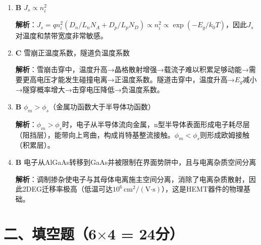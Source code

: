 \documentclass[12pt,a4paper]{ctexart}
\begin{document}
\begin{enumerate}[label=\arabic*.,nosep,leftmargin=2em]
\item \textbf{B} $J_s \propto n_i^2$

\textbf{解析}：$J_s = qn_i^2(D_n/L_nN_A + D_p/L_pN_D) \propto n_i^2 \propto \exp(-E_g/k_0T)$，因此$J_s$对温度和禁带宽度非常敏感。

\item \textbf{C} 雪崩正温度系数，隧道负温度系数

\textbf{解析}：雪崩击穿中，温度升高→晶格散射增强→载流子难以积累足够动能→需要更高电压才能发生碰撞电离→正温度系数。隧道击穿中，温度升高→$E_g$减小→隧穿概率增大→击穿电压降低→负温度系数。

\item \textbf{B} $\phi_m > \phi_s$（金属功函数大于半导体功函数）

\textbf{解析}：$\phi_m > \phi_s$时，电子从半导体流向金属，n型半导体表面形成电子耗尽层（阻挡层），能带向上弯曲，构成肖特基整流接触。$\phi_m < \phi_s$则形成欧姆接触（积累层）。

\item \textbf{B} 电子从AlGaAs转移到GaAs并被限制在界面势阱中，且与电离杂质空间分离

\textbf{解析}：调制掺杂使电子与其母体电离施主空间分离，消除了电离杂质散射，因此2DEG迁移率极高（低温可达$10^6\,\text{cm}^2/(\text{V·s})$），这是HEMT器件的物理基础。

\end{enumerate}

\newpage

\section*{二、填空题（6$\times$4 = 24分）}
\end{document}
